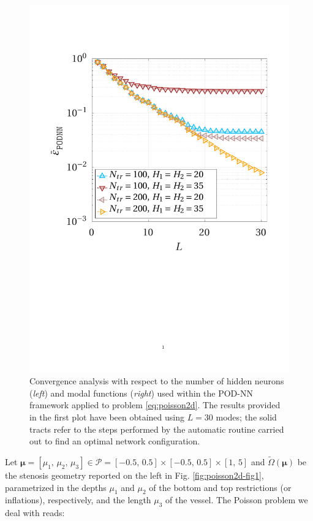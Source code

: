 \documentclass[longtitle]{elsarticle}
\numberwithin{equation}{section}
\theoremstyle{theorem}
\theoremstyle{definition}
\theoremstyle{remark}
\theoremstyle{proposition}
\numberwithin{figure}{section}
\newcommand{\wt}[1]{\widetilde{#1}}
\newcommand{\bg}[1]{\boldsymbol{#1}}
\begin{document}
\begin{figure}[t!]
			\includegraphics[scale = 0.385, trim = {1.5cm 9.8cm 1.5cm 3.8cm}, clip]{poisson2d_nn_comparison}
			
			\vspace*{-0.1cm}
						
			\caption{Convergence analysis with respect to the number of hidden neurons (\emph{left}) and modal functions (\emph{right}) used within the POD-NN framework applied to problem \eqref{eq:poisson2d}. The results provided in the first plot have been obtained using $L = 30$ modes; the solid tracts refer to the steps performed by the automatic routine carried out to find an optimal network configuration.}
			\label{fig:poisson2d-fig4}
		\end{figure}	
		Let $\bg{\mu} = [\mu_1, \, \mu_2, \, \mu_3] \in \mathcal{P} = [-0.5, \, 0.5] \times [-0.5, \, 0.5] \times [1, \, 5]$ and $\wt{\Omega}(\bg{\mu})$ be the stenosis geometry reported on the left in Fig. \ref{fig:poisson2d-fig1}, parametrized in the depths $\mu_1$ and $\mu_2$ of the bottom and top restrictions (or inflations), respectively, and the length $\mu_3$ of the vessel. The Poisson problem we deal with reads:
\end{document}
